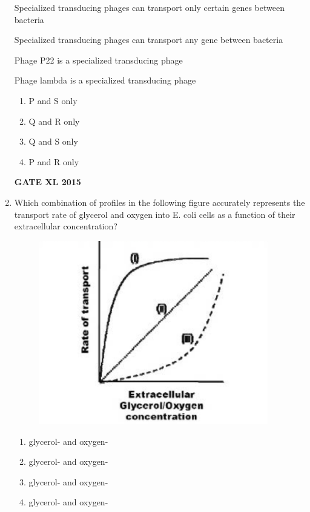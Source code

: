 \documentclass[journal,12pt,onecolumn]{IEEEtran}
\begin{document}
\begin{enumerate}
 Specialized transducing phages can transport only certain genes between bacteria

 Specialized transducing phages can transport any gene between bacteria

 Phage P22 is a specialized transducing phage

 Phage lambda  is a specialized transducing phage
    \begin{enumerate}
            \item P and S only
	    \item Q and R only
	    \item Q and S only
            \item P and R only
    \end{enumerate}
\begin{flushright}\textbf{GATE XL 2015}\end{flushright}
\item Which combination of profiles in the following figure accurately represents the transport rate of glycerol and oxygen into E. coli cells as a function of their extracellular concentration?\\
	\begin{figure}[h!]
	\includegraphics[width=10cm]{77}
		    \caption*{}
		\label{fig:Q77}
	\end{figure}
    \begin{enumerate}
	    \item glycerol- and oxygen-
	    \item glycerol- and oxygen-
	    \item glycerol- and oxygen-
	    \item glycerol- and oxygen-
    \end{enumerate}

\end{enumerate}
\end{document}
